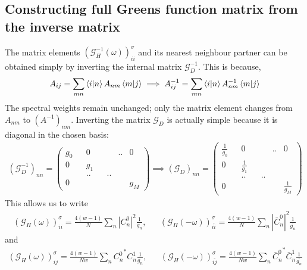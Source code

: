 \documentclass{report}
\numberwithin{equation}{section}
\begin{document}
\subsection{Constructing full Greens function matrix from the inverse matrix}
The matrix elements $\left(\mathcal{G}_{H}^{-1}(\omega)\right)_{ii}^\sigma$ and its nearest neighbour partner can be obtained simply by inverting the internal matrix $\mathcal{G}^{-1}_D$. This is because,
\begin{equation}\begin{aligned}
	A_{ij} = \sum_{mn}\braket{i | n} A_{nm} \braket{m|j} \implies A^{-1}_{ij} = \sum_{mn}\braket{i|n} A^{-1}_{nm} \braket{m|j}
\end{aligned}\end{equation}
The spectral weights remain unchanged; only the matrix element changes from $A_{nm}$ to $(A^{-1})_{nm}$. Inverting the matrix $\mathcal{G}_D$ is actually simple because it is diagonal in the chosen basis:
\begin{equation}\begin{aligned}
	\left(\mathcal{G}^{-1}_D\right)_{nn} = \begin{pmatrix} g_{0} && 0 && &..& 0\\ 0 && g_{1} && && \\ &&..&& .. &&  \\ 0 &&&&&& g_{M} \end{pmatrix} \implies \left(\mathcal{G}_D\right)_{nn} = \begin{pmatrix} \frac{1}{g_{0}} && 0 && &..& 0\\ 0 && \frac{1}{g_{1}} && && \\ &&..&& .. &&  \\ 0 &&&&&& \frac{1}{g_{M}} \end{pmatrix}
\end{aligned}\end{equation}
This allows us to write
\begin{equation}\begin{aligned}
	\label{G_mat_loc}
	\left(\mathcal{G}_{H}(\omega)\right)_{ii}^\sigma = \frac{4(w-1)}{N}\sum_{n} |C^0_{n}|^2 \frac{1}{g_n}, && \left(\mathcal{G}_{H}(-\omega)\right)_{\overline{ii}}^\sigma = \frac{4(w-1)}{N}\sum_{n} |\overline C^0_{n}|^2 \frac{1}{\overline{g_n}}
\end{aligned}\end{equation}
and
\begin{equation}\begin{aligned}
	\label{G_mat_nn}
	\left(\mathcal{G}_{H}(\omega)\right)_{ij}^\sigma = \frac{4(w-1)}{Nw}\sum_{n} {C^0_{n}}^* C^1_{n} \frac{1}{g_n}, && \left(\mathcal{G}_{H}(-\omega)\right)_{\overline{ij}}^\sigma = \frac{4(w-1)}{Nw}\sum_{n} {\overline C^0_{n}}^* \overline C^1_{n} \frac{1}{\overline{g_n}}
\end{aligned}\end{equation}
\end{document}
